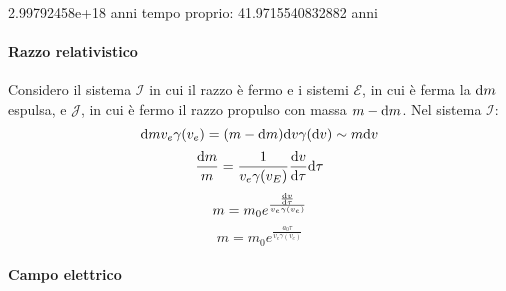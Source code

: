 2.99792458e+18  anni
tempo proprio:
41.9715540832882 anni




\paragraph{Razzo relativistico}
Considero il sistema $\mathcal{I}$ in cui il razzo \`e fermo e i sistemi $\mathcal{E}$, in cui \`e ferma la $\mathrm{d} m$ espulsa, e $\mathcal{J}$, in cui \`e fermo il razzo propulso con massa $m-\mathrm{d} m$. Nel sistema $\mathcal{I}$:
\[ \mathrm{d} m v_e \gamma(v_e) = (m - \mathrm{d} m) \mathrm{d} v \gamma(\mathrm{d} v) \sim m \mathrm{d} v \]
\[ \frac{\mathrm{d} m}{m} = \frac{1}{v_e \gamma(v_E)} \frac{\mathrm{d} v}{\mathrm{d}\tau} \mathrm{d}\tau \]
\[ m = m_0 e^{\frac{\frac{\mathrm{d} v}{\mathrm{d}\tau}}{v_e \gamma(v_e) }} \]
\[ m = m_0 e^{\frac{a_0\tau}{v_e \gamma(v_e) }} \]

\paragraph{Campo elettrico}











































